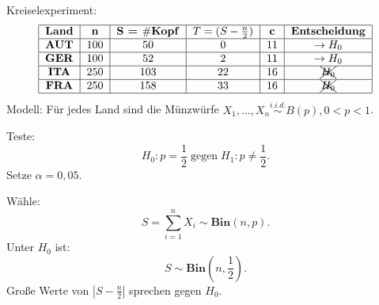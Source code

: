 \documentclass[10pt]{article}
\newcommand{\FZV}{X_1, \ldots, X_n} %
\newenvironment{BSP}[1][]
{\begin{Beispiel}[frametitle=#1]}{\end{Beispiel}}
\begin{document}
	\begin{BSP}[Beispiel 2.0.1 (Ist der Euro fair?)]
		Kreiselexperiment:
		\begin{align*}
			\begin{tabular}{|c|c|c|c|c|c|c|}
				\hline
				\textbf{Land} & \textbf{n} & \textbf{S = $\#$Kopf} & \textbf{$T = (S - \frac{n}{2})$} & \textbf{c} & \textbf{Entscheidung}\\
				\hline
				\textbf{AUT} & 100 & 50 & 0 & 11 & $\rightarrow H_0$\\
				\hline
				\textbf{GER} & 100 & 52 & 2 & 11 & $\rightarrow H_0$\\
				\hline
				\textbf{ITA} & 250 & 103 & 22 & 16 &$\xcancel{H_0}$\\
				\hline
				\textbf{FRA} & 250 & 158 & 33 & 16 &$\xcancel{H_0}$\\
				\hline
			\end{tabular}
		\end{align*}
		Modell: Für jedes Land sind die Münzwürfe $\FZV \overset{i.i.d.}{\sim} B(p), 0<p<1$.
		
		Teste:
		\begin{equation*}
			H_0: p = \frac{1}{2} \; \text{gegen} \; H_1: p \neq \frac{1}{2}.
		\end{equation*}
		Setze $\alpha = 0,05$.
		
		Wähle:
		\begin{equation*}
			S = \sum_{i = 1}^{n} X_i \sim \textbf{Bin}(n,p).
		\end{equation*}
		Unter $H_0$ ist:
		\begin{equation*}
			S \sim \textbf{Bin}\left(n, \frac{1}{2}\right).
		\end{equation*}
		Große Werte von $\left\vert S - \frac{n}{2} \right\vert$ sprechen gegen $H_0$. 
		

\end{BSP}
\end{document}
